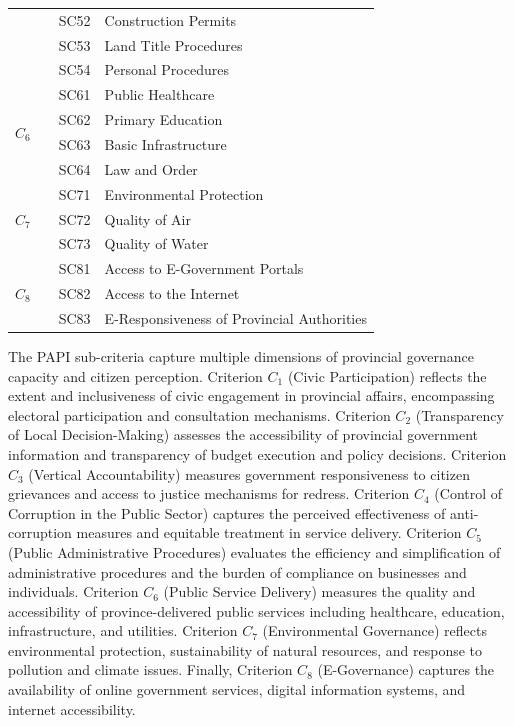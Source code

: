 \documentclass[12pt,a4paper]{article}
\begin{document}
\begin{table}[!ht]
\begin{tabular}{c >{\centering\arraybackslash}m{3.6cm} c l}
 & & SC52 & Construction Permits \\
 & & SC53 & Land Title Procedures \\
 & & SC54 & Personal Procedures \\
\midrule
\multirow{4}{*}{$C_6$} & \multirow{4}{3.6cm}{\centering Public Service Delivery} & SC61 & Public Healthcare \\
 & & SC62 & Primary Education \\
 & & SC63 & Basic Infrastructure \\
 & & SC64 & Law and Order \\
\midrule
\multirow{3}{*}{$C_7$} & \multirow{3}{3.6cm}{\centering Environmental Governance} & SC71 & Environmental Protection \\
 & & SC72 & Quality of Air \\
 & & SC73 & Quality of Water \\
\midrule
\multirow{3}{*}{$C_8$} & \multirow{3}{3.6cm}{\centering E-Governance} & SC81 & Access to E-Government Portals \\
 & & SC82 & Access to the Internet \\
 & & SC83 & E-Responsiveness of Provincial Authorities \\
\bottomrule
\end{tabular}
\end{table}

\FloatBarrier

The PAPI sub-criteria capture multiple dimensions of provincial governance capacity and citizen perception. Criterion $C_1$ (Civic Participation) reflects the extent and inclusiveness of civic engagement in provincial affairs, encompassing electoral participation and consultation mechanisms. Criterion $C_2$ (Transparency of Local Decision-Making) assesses the accessibility of provincial government information and transparency of budget execution and policy decisions. Criterion $C_3$ (Vertical Accountability) measures government responsiveness to citizen grievances and access to justice mechanisms for redress. Criterion $C_4$ (Control of Corruption in the Public Sector) captures the perceived effectiveness of anti-corruption measures and equitable treatment in service delivery. Criterion $C_5$ (Public Administrative Procedures) evaluates the efficiency and simplification of administrative procedures and the burden of compliance on businesses and individuals. Criterion $C_6$ (Public Service Delivery) measures the quality and accessibility of province-delivered public services including healthcare, education, infrastructure, and utilities. Criterion $C_7$ (Environmental Governance) reflects environmental protection, sustainability of natural resources, and response to pollution and climate issues. Finally, Criterion $C_8$ (E-Governance) captures the availability of online government services, digital information systems, and internet accessibility.
\end{document}
